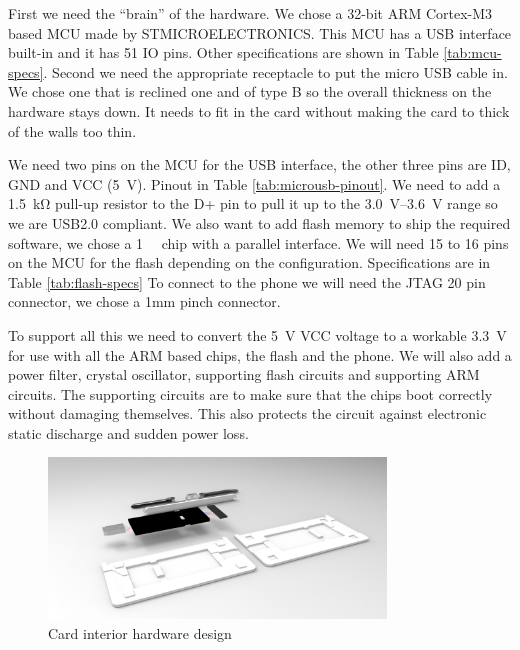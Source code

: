 \documentclass[final,a4paper]{report} %
\begin{document}
First we need the ``brain'' of the hardware.
We chose a 32-bit ARM Cortex-M3 based MCU made by STMICROELECTRONICS.
This MCU has a USB interface built-in and it has 51 IO pins.
Other specifications are shown in Table \ref{tab:mcu-specs}.
Second we need the appropriate receptacle to put the micro USB cable in.
We chose one that is reclined one and of type B so the overall thickness on the hardware stays down.
It needs to fit in the card without making the card to thick of the walls too thin.

We need two pins on the MCU for the USB interface, the other three pins are ID, GND and VCC (\SI{5}{\volt}).
Pinout in Table \ref{tab:microusb-pinout}.
We need to add a \SI{1.5}{\kilo\ohm} pull-up resistor to the D+ pin to pull it up to the \SIrange{3.0}{3.6}{\volt} range so we are USB2.0 compliant.
We also want to add flash memory to ship the required software, we chose a \SI{1}{\gibi\bit} chip with a parallel interface.
We will need 15 to 16 pins on the MCU for the flash depending on the configuration.
Specifications are in Table \ref{tab:flash-specs}
To connect to the phone we will need the JTAG 20 pin connector, we chose a 1mm pinch connector.

To support all this we need to convert the \SI{5}{\volt} VCC voltage to a workable \SI{3.3}{\volt} for use with all the ARM based chips, the flash and the phone.
We will also add a power filter, crystal oscillator, supporting flash circuits and supporting ARM circuits.
The supporting circuits are to make sure that the chips boot correctly without damaging themselves.
This also protects the circuit against electronic static discharge and sudden power loss.
\begin{figure}[H]
	\centering
	\includegraphics[width=0.8\textwidth]{resources/CardDesign3}
	\caption{Card interior hardware design}
	\label{fig:CardInteriorHardwareDesign}
\end{figure}
\end{document}
